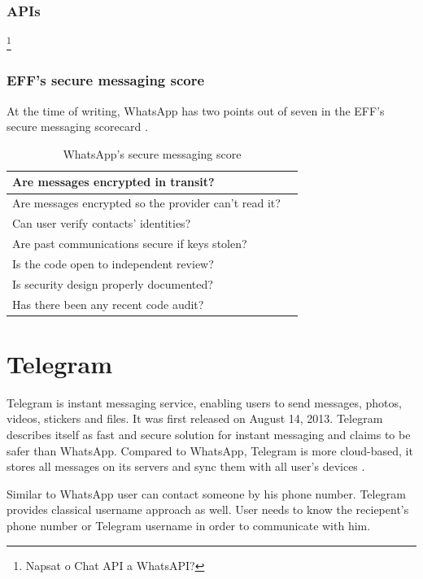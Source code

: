 \documentclass[thesis=M,english]{FITthesis}[2012/10/20]
\newcommand{\cmark}{\ding{51}}%
\newcommand{\xmark}{\ding{55}}%
\begin{document}
\subsubsection{APIs}

\footnote{Napsat o Chat API a WhatsAPI?}

\subsubsection{EFF's secure messaging score}

At the time of writing, WhatsApp has two points out of seven in the EFF's secure messaging scorecard \cite{eff-score}.

\begin{table}[htb]
	\centering
	\caption{WhatsApp's secure messaging score}
	\label{my-label}
	\begin{tabular}{|l|l|}
		\hline
		Are messages encrypted in transit? & \cmark \\\hline
		Are messages encrypted so the provider can’t read it? & \xmark \\ \hline
		Can user verify contacts’ identities? & \xmark \\ \hline
		Are past communications secure if keys stolen? & \xmark \\ \hline
		Is the code open to independent review? & \xmark \\ \hline
		Is security design properly documented? & \xmark \\ \hline
		Has there been any recent code audit? & \cmark \\ \hline
	\end{tabular}
\end{table}

\section{Telegram}

Telegram is instant messaging service, enabling users to send messages, photos, videos, stickers and files. It was first released on August 14, 2013\cite{telegramfaq}. Telegram describes itself as fast and secure solution for instant messaging \cite{telegramfaq} and claims to be safer than WhatsApp\cite{telegramfaq}. Compared to WhatsApp, Telegram is more cloud-based, it stores all messages on its servers and sync them with all user's devices \cite{telegramfaq}. 

Similar to WhatsApp user can contact someone by his phone number. Telegram provides classical username approach as well. User needs to know the reciepent's phone number or Telegram username in order to communicate with him.
\end{document}
